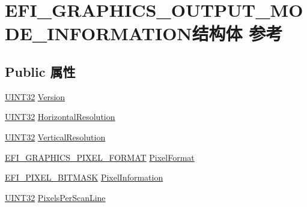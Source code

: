 \hypertarget{struct_e_f_i___g_r_a_p_h_i_c_s___o_u_t_p_u_t___m_o_d_e___i_n_f_o_r_m_a_t_i_o_n}{}\section{E\+F\+I\+\_\+\+G\+R\+A\+P\+H\+I\+C\+S\+\_\+\+O\+U\+T\+P\+U\+T\+\_\+\+M\+O\+D\+E\+\_\+\+I\+N\+F\+O\+R\+M\+A\+T\+I\+O\+N结构体 参考}
\label{struct_e_f_i___g_r_a_p_h_i_c_s___o_u_t_p_u_t___m_o_d_e___i_n_f_o_r_m_a_t_i_o_n}
\subsection*{Public 属性}
\begin{DoxyCompactItemize}
\item 
\hyperlink{_processor_bind_8h_ae1e6edbbc26d6fbc71a90190d0266018}{U\+I\+N\+T32} \hyperlink{struct_e_f_i___g_r_a_p_h_i_c_s___o_u_t_p_u_t___m_o_d_e___i_n_f_o_r_m_a_t_i_o_n_a07f8e81aa9c3291bf780fc114ee488e3}{Version}
\item 
\hyperlink{_processor_bind_8h_ae1e6edbbc26d6fbc71a90190d0266018}{U\+I\+N\+T32} \hyperlink{struct_e_f_i___g_r_a_p_h_i_c_s___o_u_t_p_u_t___m_o_d_e___i_n_f_o_r_m_a_t_i_o_n_ab0ffd01191018f2a769fbcedfcc4d46d}{Horizontal\+Resolution}
\item 
\hyperlink{_processor_bind_8h_ae1e6edbbc26d6fbc71a90190d0266018}{U\+I\+N\+T32} \hyperlink{struct_e_f_i___g_r_a_p_h_i_c_s___o_u_t_p_u_t___m_o_d_e___i_n_f_o_r_m_a_t_i_o_n_a06cde58025c3b9bb75276c04ba693c83}{Vertical\+Resolution}
\item 
\hyperlink{_graphics_output_8h_a2c8fb8916927427fbdeeff36dbecefca}{E\+F\+I\+\_\+\+G\+R\+A\+P\+H\+I\+C\+S\+\_\+\+P\+I\+X\+E\+L\+\_\+\+F\+O\+R\+M\+AT} \hyperlink{struct_e_f_i___g_r_a_p_h_i_c_s___o_u_t_p_u_t___m_o_d_e___i_n_f_o_r_m_a_t_i_o_n_a71efd74dff5f77cb3e076dd37fb9b2af}{Pixel\+Format}
\item 
\hyperlink{struct_e_f_i___p_i_x_e_l___b_i_t_m_a_s_k}{E\+F\+I\+\_\+\+P\+I\+X\+E\+L\+\_\+\+B\+I\+T\+M\+A\+SK} \hyperlink{struct_e_f_i___g_r_a_p_h_i_c_s___o_u_t_p_u_t___m_o_d_e___i_n_f_o_r_m_a_t_i_o_n_afa6ca7ac32e5d5ec38947967abea16b8}{Pixel\+Information}
\item 
\hyperlink{_processor_bind_8h_ae1e6edbbc26d6fbc71a90190d0266018}{U\+I\+N\+T32} \hyperlink{struct_e_f_i___g_r_a_p_h_i_c_s___o_u_t_p_u_t___m_o_d_e___i_n_f_o_r_m_a_t_i_o_n_afd88b66780013f006423658a3f6d8e47}{Pixels\+Per\+Scan\+Line}
\end{DoxyCompactItemize}


